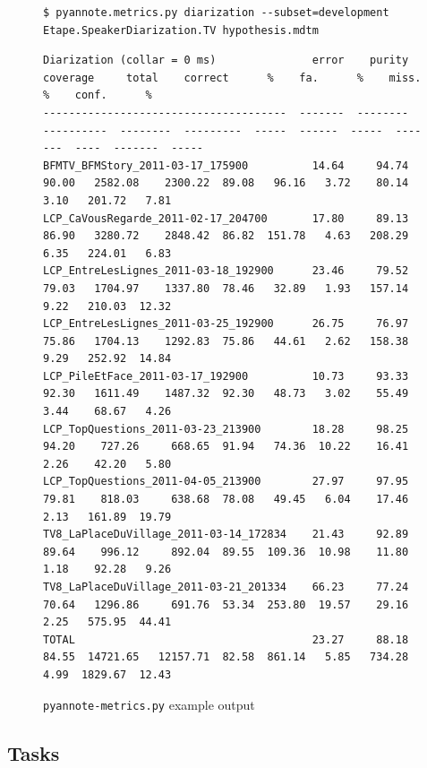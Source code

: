 \documentclass[a4paper]{article}
\begin{document}
\begin{figure}[htb]
\begin{Verbatim}[showspaces=false,fontsize=\relsize{-1}]
$ pyannote.metrics.py diarization --subset=development Etape.SpeakerDiarization.TV hypothesis.mdtm
\end{Verbatim}
\begin{Verbatim}[showspaces=false,fontsize=\relsize{-3}]
Diarization (collar = 0 ms)               error    purity    coverage     total    correct      %    fa.      %    miss.     %    conf.      %
--------------------------------------  -------  --------  ----------  --------  ---------  -----  ------  -----  -------  ----  -------  -----
BFMTV_BFMStory_2011-03-17_175900          14.64     94.74       90.00   2582.08    2300.22  89.08   96.16   3.72    80.14  3.10   201.72   7.81
LCP_CaVousRegarde_2011-02-17_204700       17.80     89.13       86.90   3280.72    2848.42  86.82  151.78   4.63   208.29  6.35   224.01   6.83
LCP_EntreLesLignes_2011-03-18_192900      23.46     79.52       79.03   1704.97    1337.80  78.46   32.89   1.93   157.14  9.22   210.03  12.32
LCP_EntreLesLignes_2011-03-25_192900      26.75     76.97       75.86   1704.13    1292.83  75.86   44.61   2.62   158.38  9.29   252.92  14.84
LCP_PileEtFace_2011-03-17_192900          10.73     93.33       92.30   1611.49    1487.32  92.30   48.73   3.02    55.49  3.44    68.67   4.26
LCP_TopQuestions_2011-03-23_213900        18.28     98.25       94.20    727.26     668.65  91.94   74.36  10.22    16.41  2.26    42.20   5.80
LCP_TopQuestions_2011-04-05_213900        27.97     97.95       79.81    818.03     638.68  78.08   49.45   6.04    17.46  2.13   161.89  19.79
TV8_LaPlaceDuVillage_2011-03-14_172834    21.43     92.89       89.64    996.12     892.04  89.55  109.36  10.98    11.80  1.18    92.28   9.26
TV8_LaPlaceDuVillage_2011-03-21_201334    66.23     77.24       70.64   1296.86     691.76  53.34  253.80  19.57    29.16  2.25   575.95  44.41
TOTAL                                     23.27     88.18       84.55  14721.65   12157.71  82.58  861.14   5.85   734.28  4.99  1829.67  12.43
\end{Verbatim}
\caption{\small{\texttt{pyannote-metrics.py}} example output}
\label{vrb:cli}
\end{figure}

\subsection{Tasks}
\end{document}
